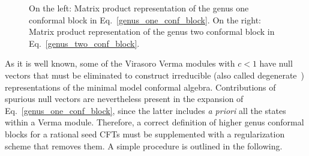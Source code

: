 \documentclass[a4paper,11pt]{article}
\begin{document}
\begin{figure}[t]
\centering
\caption{On the left: Matrix product representation of the genus one conformal block in Eq.~\eqref{genus_one_conf_block}. On the right: Matrix product representation of the genus two conformal block in Eq.~\eqref{genus_two_conf_block}.}
\label{fig-g1}
\end{figure}
As it is well known, some of the Virasoro Verma modules with $c<1$  have 
null vectors  that must be eliminated to construct irreducible (also called degenerate~\cite{Ribault}) representations of the minimal model conformal algebra.
Contributions of spurious null vectors 
are nevertheless present in the expansion of Eq.~\eqref{genus_one_conf_block}, since the latter includes \textit{a priori} all the states within a Verma module. Therefore, a correct definition of higher genus conformal blocks for a rational seed CFTs  must be supplemented with a regularization scheme that removes them. A simple procedure is outlined in the following. 
\end{document}
